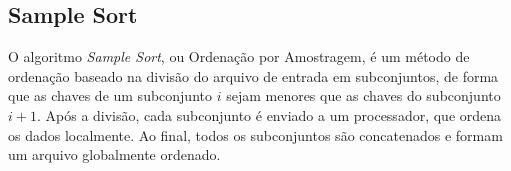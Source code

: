 


\subsection{Sample Sort}

O algoritmo \textit{Sample Sort}, ou Ordenação por Amostragem, é um método de ordenação baseado na divisão do arquivo de entrada em subconjuntos, de forma que as chaves de um subconjunto $i$ sejam menores que as chaves do subconjunto $i+1$. Após a divisão, cada subconjunto é enviado a um processador, que ordena os dados localmente. Ao final, todos os subconjuntos são concatenados e formam um arquivo globalmente ordenado.

